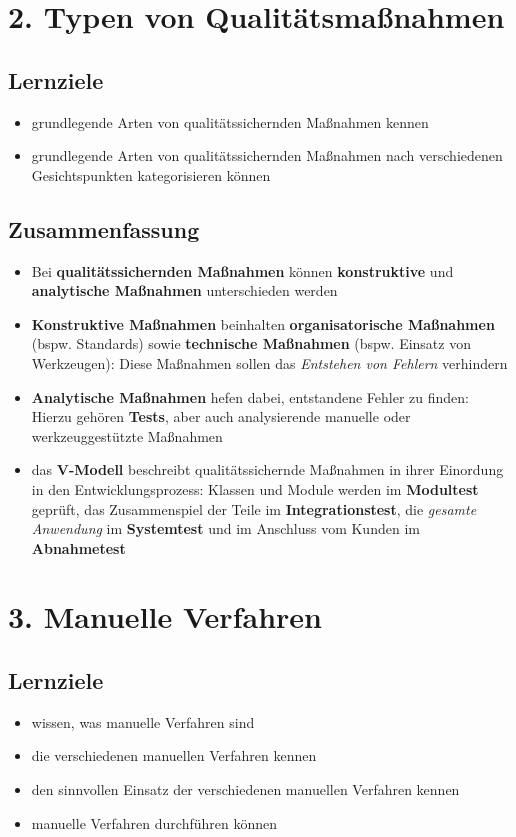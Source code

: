 \section*{2. Typen von Qualitätsmaßnahmen}
\subsection*{Lernziele}
\begin{itemize}
    \item grundlegende Arten von qualitätssichernden Maßnahmen kennen
    \item grundlegende Arten von qualitätssichernden Maßnahmen nach verschiedenen Gesichtspunkten kategorisieren können
\end{itemize}

\subsection*{Zusammenfassung}
\begin{itemize}
    \item Bei \textbf{qualitätssichernden Maßnahmen} können \textbf{konstruktive} und \textbf{analytische Maßnahmen} unterschieden werden
    \item \textbf{Konstruktive Maßnahmen} beinhalten \textbf{organisatorische Maßnahmen} (bspw. Standards)
    sowie \textbf{technische Maßnahmen} (bspw. Einsatz von Werkzeugen): Diese Maßnahmen sollen das \textit{Entstehen von Fehlern} verhindern
    \item \textbf{Analytische Maßnahmen} hefen dabei, entstandene Fehler zu finden: Hierzu gehören \textbf{Tests}, aber auch analysierende manuelle oder werkzeuggestützte Maßnahmen
    \item das \textbf{V-Modell} beschreibt qualitätssichernde Maßnahmen in ihrer Einordung in den Entwicklungsprozess: Klassen und Module werden im \textbf{Modultest} geprüft, das Zusammenspiel der Teile im \textbf{Integrationstest}, die \textit{gesamte Anwendung} im \textbf{Systemtest} und im Anschluss vom Kunden im \textbf{Abnahmetest}
\end{itemize}

\section*{3. Manuelle Verfahren}
\subsection*{Lernziele}
\begin{itemize}
    \item wissen, was manuelle Verfahren sind
    \item die verschiedenen manuellen Verfahren kennen
    \item den sinnvollen Einsatz der verschiedenen manuellen Verfahren kennen
    \item manuelle Verfahren durchführen können
\end{itemize}

